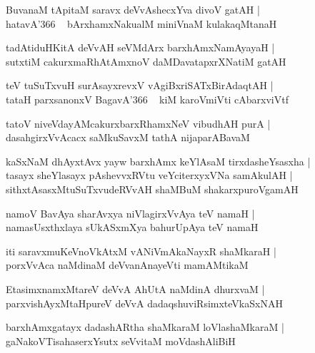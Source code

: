 \documentclass[twoside,12pt,openright]{book}
\newcounter{shloka}[chapter]
\begin{document}
\begin{shloka}%
BuvanaM tApitaM saravx deVvAshecxYva divoV gatAH |\\
hatavA\char'366 ~ bArxhamxNakualM miniVnaM kulakaqMtanaH
\end{shloka}

\begin{shloka}%
tadAtiduHKitA deVvAH seVMdArx barxhAmxNamAyayaH |\\
sutxtiM cakurxmaRhAtAmxnoV daMDavatapxrXNatiM gatAH 
\end{shloka}

\begin{shloka}%
teV tuSuTxvuH surAsayxrevxV vAgiBxriSATxBirAdaqtAH |\\
tataH parxsanonxV BagavA\char'366 ~ kiM karoVmiVti cAbarxviVtf
\end{shloka}

\begin{shloka}%
tatoV niveVdayAMcakurxbarxRhamxNeV vibudhAH purA |\\
dasahgirxVvAcacx saMkuSavxM tathA nijaparABavaM
\end{shloka}

\begin{shloka}%
kaSxNaM dhAyxtAvx yayw barxhAmx keYlAsaM tirxdasheYsasxha |\\
tasayx sheYlasayx pAshevvxRVtu veYciterxyxVNa samAkulAH |\\
sithxtAsasxMtuSuTxvudeRVvAH shaMBuM shakarxpuroVgamAH
\end{shloka}

\begin{shloka}%
namoV BavAya sharAvxya niVlagirxVvAya teV namaH |\\
namasUsxthxlaya sUkASxmXya bahurUpAya teV namaH 
\end{shloka}

\begin{shloka}%
iti saravxmuKeVnoVkAtxM vANiVmAkaNayxR shaMkaraH |\\
porxVvAca naMdinaM deVvanAnayeVti mamAMtikaM 
\end{shloka}

\begin{shloka}%
EtasimxnamxMtareV deVvA AhUtA naMdinA dhurxvaM |\\
parxvishAyxMtaHpureV deVvA dadaqshuviRsimxteVkaSxNAH 
\end{shloka}

\begin{shloka}%
barxhAmxgatayx dadashARtha shaMkaraM loVlashaMkaraM |\\
gaNakoVTisahaserxYsutx seVvitaM moVdashAliBiH 
\end{shloka}
\end{document}
